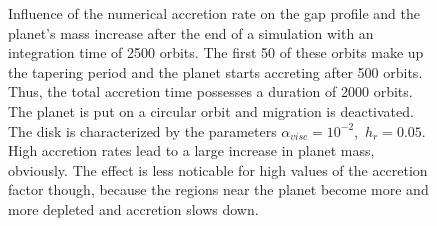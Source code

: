       \begin{figure}[h!]
        \centering
        \begin{minipage}{.5\linewidth}
          \centering
        \end{minipage}%
        \begin{minipage}{.5\linewidth}
          \centering
        \end{minipage}
        \caption{
          Influence of the numerical accretion rate on the gap profile
          and the planet's mass increase after the end of a simulation
          with an integration time of 2500 orbits. The first 50 of these orbits 
          make up the tapering period and the planet starts accreting after 500 
          orbits. Thus, the total accretion time possesses a duration of 
          2000 orbits. The planet is put on a circular orbit and migration is
          deactivated. The disk is characterized by the parameters 
          $\alpha_{visc}=10^{-2}$,\ $h_r=0.05$.
          High accretion rates lead to a large increase in planet mass, 
          obviously. The effect is less noticable for high values of the 
          accretion factor though, because the regions near the planet 
          become more and more depleted and accretion slows down.
        }
        \label{fig:influence_of_machida}
      \end{figure} \ \\

    \clearpage
